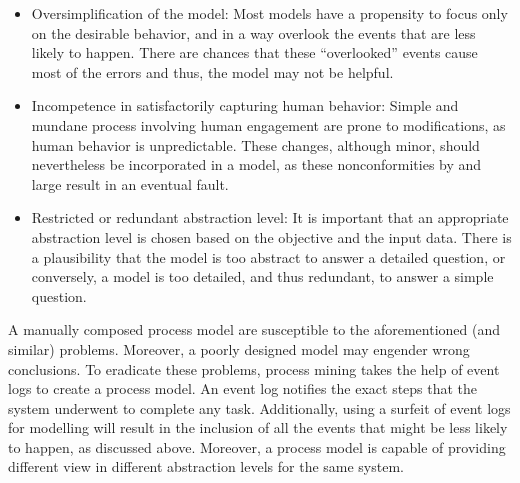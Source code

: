 \begin{itemize}
	\item Oversimplification of the model: Most models have a propensity to focus only on the desirable behavior, and in a way overlook the events that are less likely to happen. There are chances that these “overlooked” events cause most of the errors and thus, the model may not be helpful.
	\item Incompetence in satisfactorily capturing human behavior: Simple and mundane process involving human engagement are prone to modifications, as human behavior is unpredictable. These changes, although minor, should nevertheless be incorporated in a model, as these nonconformities by and large result in an eventual fault.
	\item Restricted or redundant abstraction level: It is important that an appropriate abstraction level is chosen based on the objective and the input data. There is a plausibility that the model is too abstract to answer a detailed question, or conversely, a model is too detailed, and thus redundant, to answer a simple question.
\end{itemize}

A manually composed process model are susceptible to the aforementioned (and similar) problems. Moreover, a poorly designed model may engender wrong conclusions. To eradicate these problems, process mining takes the help of event logs to create a process model. An event log notifies the exact steps that the system underwent to complete any task. Additionally, using a surfeit of event logs for modelling will result in the inclusion of all the events that might be less likely to happen, as discussed above. Moreover, a process model is capable of providing different view in different abstraction levels for the same system.


